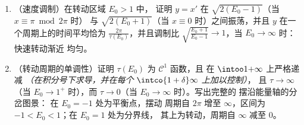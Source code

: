 \begin{problem}
\begin{enumerate}[resume]
  \item （速度调制）在转动区域 $E_0 > 1$ 中，
        证明 $y = x'$ 在
        $\sqrt{2(E_0 - 1)}$（当 $x \equiv \pi \bmod 2\pi$ 时）
        与 $\sqrt{2(E_0 + 1)}$（当 $x \equiv 0$ 时）之间振荡，并且
        $y$ 在一个周期上的时间平均恰为
        $\frac{2\pi}{\tau(E_0)}$，并且调制比
        $\sqrt{\frac{E_0 + 1}{E_0 - 1}} \to 1$，当 $E_0
        \to \infty$ 时：快速转动渐近
        均匀。
  \item （转动周期的单调性）证明
        $\tau(E_0)$ 为 $\mathcal C^1$ 函数，且
        在 $\intoo1{+\infty}$ 上严格递减
        \emph{（在积分号下求导，并在每个
        $\intco{1 + \delta}\infty$ 上加以控制）}，
        且 $\tau \to \infty$（当 $E_0 \to 1^+$ 时），而 $\tau
        \to 0$（当 $E_0 \to \infty$ 时）。写出完整的
        摆沿能量轴的分岔图景：
        在 $E_0 = -1$ 处为平衡点，摆动
        周期自 $2\pi$ 增至 $\infty$，区间为
        $-1 < E_0 < 1$；在 $E_0 = 1$ 处为分界线，
        其上为转动，周期自 $\infty$ 减至
        $0$。
\end{enumerate}
\end{problem}
